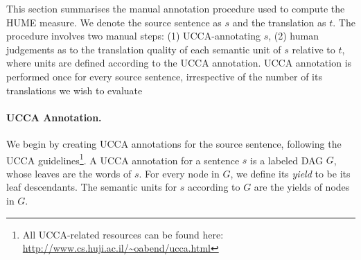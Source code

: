 \documentclass[11pt,letterpaper]{article}
\newcommand{\secref}[1]{\S\ref{#1}}
\begin{document}
This section summarises the manual annotation procedure used
to compute the HUME measure. 
We denote the source sentence as $s$ and the translation as $t$. 
The procedure involves two manual steps: (1) UCCA-annotating $s$, 
(2) human judgements as to the translation quality of each semantic unit of $s$ relative to $t$,
where units are defined according to the UCCA annotation.
UCCA annotation is performed once for every source sentence,
irrespective of the number of its translations we wish
to evaluate

\paragraph{UCCA Annotation.}
We begin by creating UCCA annotations for the source sentence, following the
UCCA guidelines\footnote{All UCCA-related resources can be found
  here: \url{http://www.cs.huji.ac.il/~oabend/ucca.html}}.
A UCCA annotation for a sentence $s$ is a labeled DAG $G$, whose leaves
are the words of $s$.
For every node in $G$, we define its {\it yield} to be its leaf descendants.
The semantic units for $s$ according to $G$ are the yields of nodes in $G$. 

\end{document}
